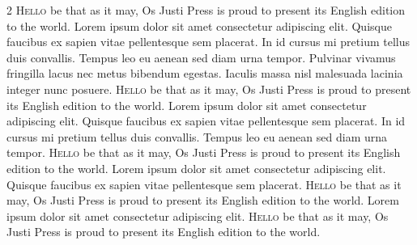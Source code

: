 \documentclass[openany]{book}
\begin{document}
\begin{multicols}{2}
\lettrine[lines=2]{H}{ello} be that as it may, Os Justi Press is proud to present its English edition to the world. Lorem ipsum dolor sit amet consectetur adipiscing elit. Quisque faucibus ex sapien vitae pellentesque sem placerat. In id cursus mi pretium tellus duis convallis. Tempus leo eu aenean sed diam urna tempor. Pulvinar vivamus fringilla lacus nec metus bibendum egestas. Iaculis massa nisl malesuada lacinia integer nunc posuere.
\lettrine[lines=2]{H}{ello} be that as it may, Os Justi Press is proud to present its English edition to the world. Lorem ipsum dolor sit amet consectetur adipiscing elit. Quisque faucibus ex sapien vitae pellentesque sem placerat. In id cursus mi pretium tellus duis convallis. Tempus leo eu aenean sed diam urna tempor.
\lettrine[lines=2]{H}{ello} be that as it may, Os Justi Press is proud to present its English edition to the world. Lorem ipsum dolor sit amet consectetur adipiscing elit. Quisque faucibus ex sapien vitae pellentesque sem placerat.
\lettrine[lines=2]{H}{ello} be that as it may, Os Justi Press is proud to present its English edition to the world. Lorem ipsum dolor sit amet consectetur adipiscing elit.
\lettrine[lines=2]{H}{ello} be that as it may, Os Justi Press is proud to present its English edition to the world.

\end{multicols}
\end{document}
